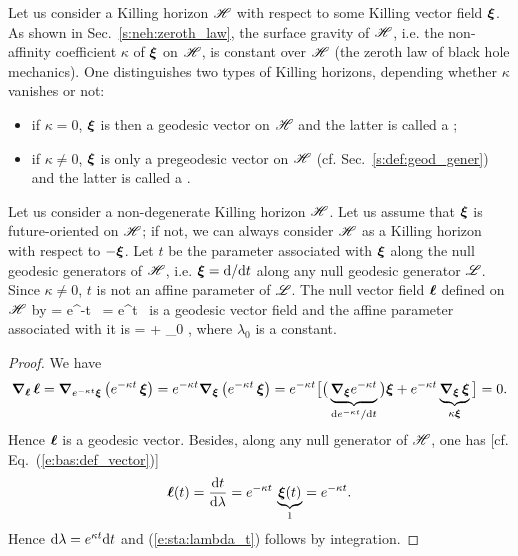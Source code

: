 Let us consider a Killing horizon $\mathscr{H}$ with respect to some Killing vector
field $\bm{\xi}$. As shown in Sec.~\ref{s:neh:zeroth_law},
the surface gravity  of $\mathscr{H}$, i.e.
the non-affinity coefficient $\kappa$ of $\bm{\xi}$ on $\mathscr{H}$, is constant over
$\mathscr{H}$ (the zeroth law of black hole mechanics).
One distinguishes two types of Killing horizons, depending whether $\kappa$
vanishes or not:
\begin{itemize}
\item if $\kappa = 0$, $\bm{\xi}$ is then a geodesic vector on $\mathscr{H}$
and the latter is called a ;
\item if $\kappa \not=0$, $\bm{\xi}$ is only a pregeodesic vector on $\mathscr{H}$
(cf. Sec.~\ref{s:def:geod_gener})
and the latter is called a .
\end{itemize}
Let us consider a non-degenerate Killing horizon $\mathscr{H}$.
Let us assume that $\bm{\xi}$ is future-oriented on $\mathscr{H}$; if not, we can
always consider $\mathscr{H}$ as a Killing horizon with respect to $-\bm{\xi}$.
Let $t$ be the parameter
associated with $\bm{\xi}$ along the null geodesic generators of $\mathscr{H}$, i.e.
$\bm{\xi} = \mathrm{d}/\mathrm{d} t$ along any null geodesic generator $\mathscr{L}$.
Since $\kappa\not=0$, $t$ is not an affine parameter of $\mathscr{L}$.
The null vector field $\bm{\ell}$ defined on $\mathscr{H}$ by
\be \label{e:sta:el_kappa_xi}
    \wl = e^{-\kappa t} \, \w{\xi} \quad \iff\quad
    \w{\xi} = e^{\kappa t} \, \wl
\ee
is a geodesic vector field and the affine parameter associated with it is
\be \label{e:sta:lambda_t}
    \lambda =  + \lambda_0 ,
\ee
where $\lambda_0$ is a constant.
\begin{proof}
We have
\[
\bm{\nabla}_{\bm{\ell}}\, \bm{\ell} = \bm{\nabla}_{e^{-\kappa t} \bm{\xi}} \left( e^{-\kappa t} \, \bm{\xi} \right) = e^{-\kappa t} \bm{\nabla}_{\bm{\xi}} \left( e^{-\kappa t} \, \bm{\xi} \right)
= e^{-\kappa t} \big[ \big( \underbrace{\bm{\nabla}_{\bm{\xi}} e^{-\kappa t}}_{\mathrm{d} e^{-\kappa t}/\mathrm{d} t} \big) \bm{\xi}
    + e^{-\kappa t} \underbrace{\bm{\nabla}_{\bm{\xi}}\, \bm{\xi}}_{\kappa\bm{\xi}}
    \big] = 0 .
\]
Hence $\bm{\ell}$ is a geodesic vector. Besides, along any null generator of $\mathscr{H}$,
one has [cf. Eq.~(\ref{e:bas:def_vector})]
\[
    \bm{\ell}(t) = \frac{\mathrm{d} t}{\mathrm{d} \lambda} = e^{-\kappa t} \, \underbrace{\bm{\xi}(t)}_{1} =
        e^{-\kappa t} .
\]
Hence $\mathrm{d}\lambda = e^{\kappa t} \mathrm{d} t$ and (\ref{e:sta:lambda_t}) follows
by integration.
\end{proof}
